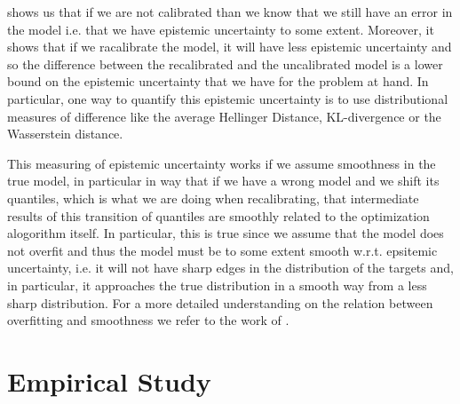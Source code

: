 

 shows us that if we are not calibrated than we know that we still have an error in the model i.e. that we have epistemic uncertainty to some extent. Moreover, it shows that if we racalibrate the model, it will have less epistemic uncertainty and so the difference between the recalibrated and the uncalibrated model is a lower bound on the epistemic uncertainty that we have for the problem at hand. In particular, one way to quantify this epistemic uncertainty is to use distributional measures of difference like the average Hellinger Distance, KL-divergence or the Wasserstein distance.

This measuring of epistemic uncertainty works if we assume smoothness in the true model, in particular in way that if we have a wrong model and we shift its quantiles, which is what we are doing when recalibrating, that intermediate results of this transition of quantiles are smoothly related to the optimization alogorithm itself. In particular, this is true since we assume that the model does not overfit and thus the model must be to some extent smooth w.r.t. epsitemic uncertainty, i.e. it will not have sharp edges in the distribution of the targets and, in particular, it approaches the true distribution in a smooth way from a less sharp distribution. For a more detailed understanding on the relation between overfitting and smoothness we refer to the work of \cite{bishop2006pattern}.

\chapter{Empirical Study}\label{chap:empirical_study}


